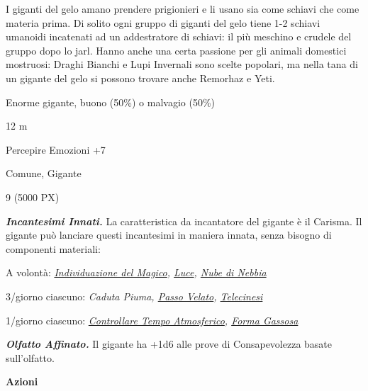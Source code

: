 \begin{multicols}{2}
{I giganti del gelo amano prendere prigionieri e li usano sia come schiavi che come materia prima. Di solito ogni gruppo di giganti del gelo tiene 1-2 schiavi umanoidi incatenati ad un addestratore di schiavi: il più meschino e crudele del gruppo dopo lo jarl. Hanno anche una certa passione per gli animali domestici mostruosi: Draghi Bianchi e Lupi Invernali sono scelte popolari, ma nella tana di un gigante del gelo si possono trovare anche Remorhaz e Yeti.

\begin{description}[noitemsep, topsep=0pt, parsep=0pt, partopsep=0pt, itemsep=1pt, leftmargin=2.35cm,  labelwidth=2.2cm, itemindent=0cm, listparindent=0pt] %
\setlength{\baselineskip}{10pt}
\item[\textbf{Taglia/Tipo}] Enorme gigante, buono (50\%) o malvagio (50\%)
\item[\textbf{Caratt.}] 
\item[\textbf{Punti Ferita}] 
\item[\textbf{Movimento}] 12 m
\item[\textbf{Tiri Salvez.}] 
\item[\textbf{Comp.}] Percepire Emozioni +7
\item[\textbf{Linguaggi}] Comune, Gigante
\item[\textbf{Sfida}] 9 (5000 PX)
\end{description}
\smallskip

\emph{\textbf{Incantesimi Innati.}} La caratteristica da incantatore del gigante è il Carisma. Il gigante può lanciare questi incantesimi in maniera innata, senza bisogno di componenti materiali:

A volontà: \emph{\hyperlink{Individuazione del Magico}{Individuazione del Magico}, \hyperlink{Luce}{Luce}, \hyperlink{Nube di Nebbia}{Nube di Nebbia}}

3/giorno ciascuno: \emph{Caduta Piuma, \hyperlink{Passo Velato}{Passo Velato}, \hyperlink{Telecinesi}{Telecinesi}}

1/giorno ciascuno: \emph{\hyperlink{Controllare Tempo Atmosferico}{Controllare Tempo Atmosferico}, \hyperlink{Forma Gassosa}{Forma Gassosa}}

\emph{\textbf{Olfatto Affinato.}} Il gigante ha +1d6 alle prove di Consapevolezza basate sull'olfatto.

\textbf{Azioni}

}
\end{multicols}
